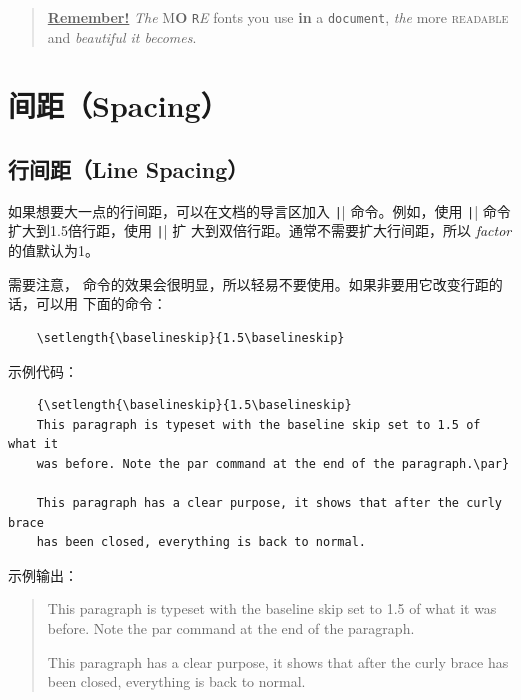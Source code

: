 \documentclass[UTF8]{ctexart}
\begin{document}
\begin{quote}
  \underline{\textbf{Remember\Huge!}} \textit{The}
  \textsf{M\textbf{\LARGE O} \texttt{R}\textsl{E}} fonts \Huge you
  \tiny use \footnotesize \textbf{in} a \small \texttt{document},
  \large \textit{the} \normalsize more \textsc{readable} and
  \textsl{\textsf{beautiful} it bec\large o\Large m\LARGE e\huge s}.
\end{quote}

\section{间距（Spacing）}
\subsection{行间距（Line Spacing）}
如果想要大一点的行间距，可以在文档的导言区加入 \texttt|\linespread{factor}| 命令。例如，使用
\linebreak[6] \texttt|\linespread{1.3}| 命令扩大到1.5倍行距，使用 \texttt|\linespread{1.6}| 扩
大到双倍行距。通常不需要扩大行间距，所以 \emph{factor} 的值默认为1。

需要注意，\texttt{\linespread} 命令的效果会很明显，所以轻易不要使用。如果非要用它改变行距的话，可以用
下面的命令：
\begin{verbatim}
    \setlength{\baselineskip}{1.5\baselineskip}
\end{verbatim}

示例代码：
\begin{verbatim}
    {\setlength{\baselineskip}{1.5\baselineskip}
    This paragraph is typeset with the baseline skip set to 1.5 of what it
    was before. Note the par command at the end of the paragraph.\par}

    This paragraph has a clear purpose, it shows that after the curly brace
    has been closed, everything is back to normal.
\end{verbatim}

示例输出：
\begin{quote}
    {\setlength{\baselineskip}{1.5\baselineskip}
    This paragraph is typeset with the baseline skip set to 1.5 of what it
    was before. Note the par command at the end of the paragraph.\par}

    This paragraph has a clear purpose, it shows that after the curly brace
    has been closed, everything is back to normal.
\end{quote}
\end{document}
